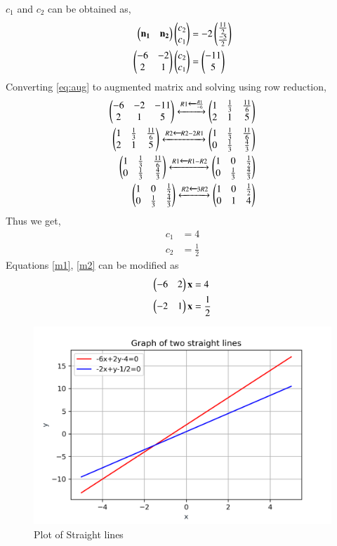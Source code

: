 \documentclass[journal,12pt,twocolumn]{IEEEtran}
\begin{document}
$c_1$ and $c_2$ can be obtained as, 
\begin{align}
    \begin{pmatrix}\mathbf{n_1} & \mathbf{n_2}\end{pmatrix}\begin{pmatrix}c_2\\c_1\end{pmatrix} & =-2\begin{pmatrix}\frac{11}{2}\\\frac{-5}{2}\end{pmatrix} \\
    \begin{pmatrix}-6 & -2 \\2 & 1\end{pmatrix}\begin{pmatrix}c_2\\c_1\end{pmatrix} &= \begin{pmatrix}-11 \\ 5\end{pmatrix} \label{eq:aug}
\end{align}
Converting \eqref{eq:aug} to augmented matrix and solving using row reduction, 
\begin{align}
    \begin{pmatrix}-6 & -2 & -11 \\ 2 & 1 & 5\end{pmatrix} \xleftrightarrow[]{R1 \xleftarrow{} \frac{R1}{-6}} \begin{pmatrix}1 & \frac{1}{3} & \frac{11}{6} \\ 2 & 1 & 5\end{pmatrix} \\
    \begin{pmatrix}1 & \frac{1}{3} & \frac{11}{6} \\ 2 & 1 & 5\end{pmatrix}\xleftrightarrow[]{R2 \xleftarrow{} R2-2R1 } \begin{pmatrix}1 & \frac{1}{3} & \frac{11}{6} \\ 0 & \frac{1}{3} & \frac{4}{3}\end{pmatrix} \\ 
    \begin{pmatrix}1 & \frac{1}{3} & \frac{11}{6} \\ 0 & \frac{1}{3} & \frac{4}{3}\end{pmatrix}
    \xleftrightarrow[]{R1 \xleftarrow{} R1-R2} \begin{pmatrix}1 & 0 & \frac{1}{2} \\ 0 & \frac{1}{3} & \frac{4}{3}\end{pmatrix} \\
    \begin{pmatrix}1 & 0 & \frac{1}{2} \\ 0 & \frac{1}{3} & \frac{4}{3}\end{pmatrix}
    \xleftrightarrow[]{R2 \xleftarrow{} 3R2} \begin{pmatrix}1 & 0 & \frac{1}{2} \\ 0 & 1 & 4\end{pmatrix}
\end{align}
Thus we get, 
\begin{align}
    c_1 &= 4\\
    c_2 &= \frac{1}{2}
\end{align}
Equations \eqref{m1}, \eqref{m2} can be modified as
\begin{align}
    \begin{pmatrix}-6 & 2\end{pmatrix}\mathbf{x} &= 4\\
    \begin{pmatrix}-2 & 1\end{pmatrix}\mathbf{x} &= \frac{1}{2}
\end{align}
\renewcommand{\thefigure}{\arabic{figure}}
\begin{figure}[h!]
	\centering
	\includegraphics[width=\columnwidth]{straightlines.png}
	\caption{Plot of Straight lines}
	\label{fig_1}
\end{figure}
\\
\end{document}
